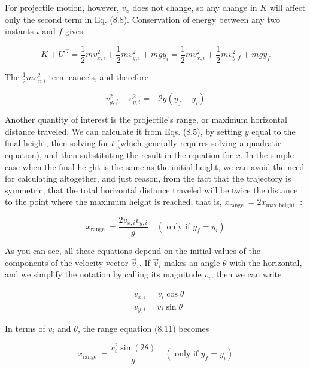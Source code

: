 \documentclass[10pt]{article}
\begin{document}
For projectile motion, however, $v_{x}$ does not change, so any change in $K$ will affect only the second term in Eq. (8.8). Conservation of energy between any two instants $i$ and $f$ gives


\begin{equation*}
K+U^{G}=\frac{1}{2} m v_{x, i}^{2}+\frac{1}{2} m v_{y, i}^{2}+m g y_{i}=\frac{1}{2} m v_{x, i}^{2}+\frac{1}{2} m v_{y, f}^{2}+m g y_{f} \tag{8.9}
\end{equation*}


The $\frac{1}{2} m v_{x, i}^{2}$ term cancels, and therefore


\begin{equation*}
v_{y, f}^{2}-v_{y, i}^{2}=-2 g\left(y_{f}-y_{i}\right) \tag{8.10}
\end{equation*}


Another quantity of interest is the projectile's range, or maximum horizontal distance traveled. We can calculate it from Eqs. (8.5), by setting $y$ equal to the final height, then solving for $t$ (which generally requires solving a quadratic equation), and then substituting the result in the equation for $x$. In the simple case when the final height is the same as the initial height, we can avoid the need for calculating altogether, and just reason, from the fact that the trajectory is symmetric, that the total horizontal distance traveled will be twice the distance to the point where the maximum height is reached, that is, $x_{\text {range }}=2 x_{\text {max height }}$ :


\begin{equation*}
x_{\text {range }}=\frac{2 v_{x, i} v_{y, i}}{g} \quad\left(\text { only if } y_{f}=y_{i}\right) \tag{8.11}
\end{equation*}


As you can see, all these equations depend on the initial values of the components of the velocity vector $\vec{v}_{i}$. If $\vec{v}_{i}$ makes an angle $\theta$ with the horizontal, and we simplify the notation by calling its magnitude $v_{i}$, then we can write


\begin{align*}
& v_{x, i}=v_{i} \cos \theta \\
& v_{y, i}=v_{i} \sin \theta \tag{8.12}
\end{align*}


In terms of $v_{i}$ and $\theta$, the range equation (8.11) becomes


\begin{equation*}
x_{\text {range }}=\frac{v_{i}^{2} \sin (2 \theta)}{g} \quad\left(\text { only if } y_{f}=y_{i}\right) \tag{8.13}
\end{equation*}
\end{document}
